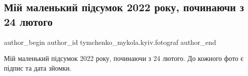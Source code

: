  
 
 
 
 
 
\subsection{Мій маленький підсумок 2022 року, починаючи з 24 лютого}
\label{sec:03_01_2023.fb.tymchenko_mykola.kyiv.fotograf.2.pidsumok}
 
\ifcmt
 author_begin
   author_id tymchenko_mykola.kyiv.fotograf
 author_end
\fi

Мій маленький підсумок 2022 року, починаючи з 24 лютого. До кожного фото є
підпис та дата зйомки.
